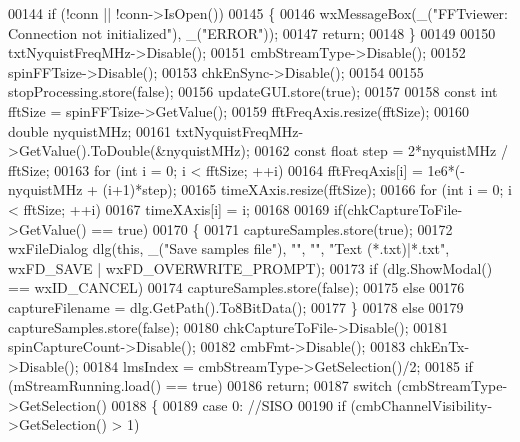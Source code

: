 \begin{DoxyCode}
00144     \textcolor{keywordflow}{if} (!conn || !conn->IsOpen())
00145     \{
00146         wxMessageBox(\_(\textcolor{stringliteral}{"FFTviewer: Connection not initialized"}), \_(\textcolor{stringliteral}{"ERROR"}));
00147         \textcolor{keywordflow}{return};
00148     \}
00149 
00150     txtNyquistFreqMHz->Disable();
00151     cmbStreamType->Disable();
00152     spinFFTsize->Disable();
00153     chkEnSync->Disable();
00154 
00155     stopProcessing.store(\textcolor{keyword}{false});
00156     updateGUI.store(\textcolor{keyword}{true});
00157 
00158     \textcolor{keyword}{const} \textcolor{keywordtype}{int} fftSize = spinFFTsize->GetValue();
00159     fftFreqAxis.resize(fftSize);
00160     \textcolor{keywordtype}{double} nyquistMHz;
00161     txtNyquistFreqMHz->GetValue().ToDouble(&nyquistMHz);
00162     \textcolor{keyword}{const} \textcolor{keywordtype}{float} step = 2*nyquistMHz / fftSize;
00163     \textcolor{keywordflow}{for} (\textcolor{keywordtype}{int} i = 0; i < fftSize; ++i)
00164         fftFreqAxis[i] = 1e6*(-nyquistMHz + (i+1)*step);
00165     timeXAxis.resize(fftSize);
00166     \textcolor{keywordflow}{for} (\textcolor{keywordtype}{int} i = 0; i < fftSize; ++i)
00167         timeXAxis[i] = i;
00168 
00169     \textcolor{keywordflow}{if}(chkCaptureToFile->GetValue() == \textcolor{keyword}{true})
00170     \{
00171         captureSamples.store(\textcolor{keyword}{true});
00172         wxFileDialog dlg(\textcolor{keyword}{this}, \_(\textcolor{stringliteral}{"Save samples file"}), \textcolor{stringliteral}{""}, \textcolor{stringliteral}{""}, \textcolor{stringliteral}{"Text (*.txt)|*.txt"}, wxFD\_SAVE | 
      wxFD\_OVERWRITE\_PROMPT);
00173         \textcolor{keywordflow}{if} (dlg.ShowModal() == wxID\_CANCEL)
00174             captureSamples.store(\textcolor{keyword}{false});
00175         \textcolor{keywordflow}{else}
00176             captureFilename = dlg.GetPath().To8BitData();
00177     \}
00178     \textcolor{keywordflow}{else}
00179         captureSamples.store(\textcolor{keyword}{false});
00180     chkCaptureToFile->Disable();
00181     spinCaptureCount->Disable();
00182     cmbFmt->Disable();
00183     chkEnTx->Disable();
00184     lmsIndex = cmbStreamType->GetSelection()/2;
00185     \textcolor{keywordflow}{if} (mStreamRunning.load() == \textcolor{keyword}{true})
00186         \textcolor{keywordflow}{return};
00187     \textcolor{keywordflow}{switch} (cmbStreamType->GetSelection()%
00188     \{
00189     \textcolor{keywordflow}{case} 0: \textcolor{comment}{//SISO}
00190         \textcolor{keywordflow}{if} (cmbChannelVisibility->GetSelection() > 1)

\end{DoxyCode}
